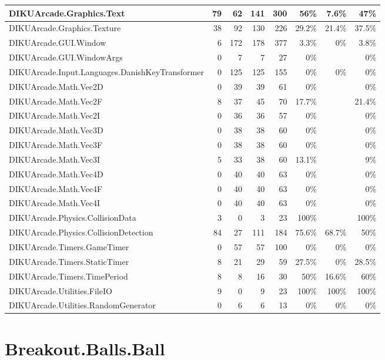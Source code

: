 \documentclass[a4paper,landscape,10pt]{article}
\begin{document}
\begin{longtable}[l]{|l|r|r|r|r|r|r|r|}
\hline
DIKUArcade.Graphics.Text & 79 & 62 & 141 & 300 & 56\% & 7.6\% & 47\%\\
\hline
DIKUArcade.Graphics.Texture & 38 & 92 & 130 & 226 & 29.2\% & 21.4\% & 37.5\%\\
\hline
DIKUArcade.GUI.Window & 6 & 172 & 178 & 377 & 3.3\% & 0\% & 3.8\%\\
\hline
DIKUArcade.GUI.WindowArgs & 0 & 7 & 7 & 27 & 0\% &  & 0\%\\
\hline
DIKUArcade.Input.Languages.DanishKeyTransformer & 0 & 125 & 125 & 155 & 0\% & 0\% & 0\%\\
\hline
DIKUArcade.Math.Vec2D & 0 & 39 & 39 & 61 & 0\% &  & 0\%\\
\hline
DIKUArcade.Math.Vec2F & 8 & 37 & 45 & 70 & 17.7\% &  & 21.4\%\\
\hline
DIKUArcade.Math.Vec2I & 0 & 36 & 36 & 57 & 0\% &  & 0\%\\
\hline
DIKUArcade.Math.Vec3D & 0 & 38 & 38 & 60 & 0\% &  & 0\%\\
\hline
DIKUArcade.Math.Vec3F & 0 & 38 & 38 & 60 & 0\% &  & 0\%\\
\hline
DIKUArcade.Math.Vec3I & 5 & 33 & 38 & 60 & 13.1\% &  & 9\%\\
\hline
DIKUArcade.Math.Vec4D & 0 & 40 & 40 & 63 & 0\% &  & 0\%\\
\hline
DIKUArcade.Math.Vec4F & 0 & 40 & 40 & 63 & 0\% &  & 0\%\\
\hline
DIKUArcade.Math.Vec4I & 0 & 40 & 40 & 63 & 0\% &  & 0\%\\
\hline
DIKUArcade.Physics.CollisionData & 3 & 0 & 3 & 23 & 100\% &  & 100\%\\
\hline
DIKUArcade.Physics.CollisionDetection & 84 & 27 & 111 & 184 & 75.6\% & 68.7\% & 50\%\\
\hline
DIKUArcade.Timers.GameTimer & 0 & 57 & 57 & 100 & 0\% & 0\% & 0\%\\
\hline
DIKUArcade.Timers.StaticTimer & 8 & 21 & 29 & 59 & 27.5\% & 0\% & 28.5\%\\
\hline
DIKUArcade.Timers.TimePeriod & 8 & 8 & 16 & 30 & 50\% & 16.6\% & 60\%\\
\hline
DIKUArcade.Utilities.FileIO & 9 & 0 & 9 & 23 & 100\% & 100\% & 100\%\\
\hline
DIKUArcade.Utilities.RandomGenerator & 0 & 6 & 6 & 13 & 0\% & 0\% & 0\%\\
\hline
\end{longtable}
\newpage
\section{Breakout.Balls.Ball}
\end{document}
